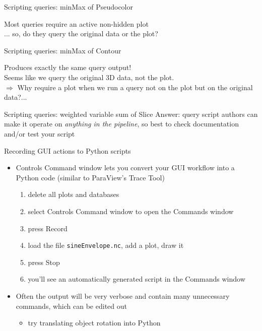 \begin{frame}{Scripting queries: minMax of Pseudocolor}
  
  \begin{block}{}{}\vspace{-3mm}\outIdentical\vspace{-3mm}\end{block}
  \bigskip
  Most queries require an active non-hidden plot\\ ... so, do they query the original data or the plot?
\end{frame}

\begin{frame}{Scripting queries: minMax of Contour}
  
  \pause
  Produces exactly the same query output!\\
  Seems like we query the original 3D data, not the plot.\\
  $\Rightarrow$ Why require a plot when we run a query not on the plot but on the original data?...
\end{frame}

\begin{frame}{Scripting queries: weighted variable sum of Slice}
  Answer: query script authors can make it operate on \emph{anything in the pipeline},
  so best to check documentation and/or test your script
  \bigskip
  
\end{frame}

\begin{frame}{Recording GUI actions to Python scripts}
  \begin{itemize}\setlength{\itemsep}{3mm}
  \item Controls \ra Command window lets you convert your GUI workflow into a Python code (similar to
    ParaView's Trace Tool)
    \begin{enumerate}\setlength{\itemsep}{1mm}
    \item delete all plots and databases
    \item select Controls \ra Command window to open the Commands window
    \item press Record
    \item load the file \texttt{sineEnvelope.nc}, add a plot, draw it
    \item press Stop
    \item you'll see an automatically generated script in the Commands window
    \end{enumerate}
  \item Often the output will be very verbose and contain many unnecessary commands, which can be edited out
    \begin{itemize}\setlength{\itemsep}{1mm}
    \item try translating object rotation into Python
    \end{itemize}
  \end{itemize}
\end{frame}

